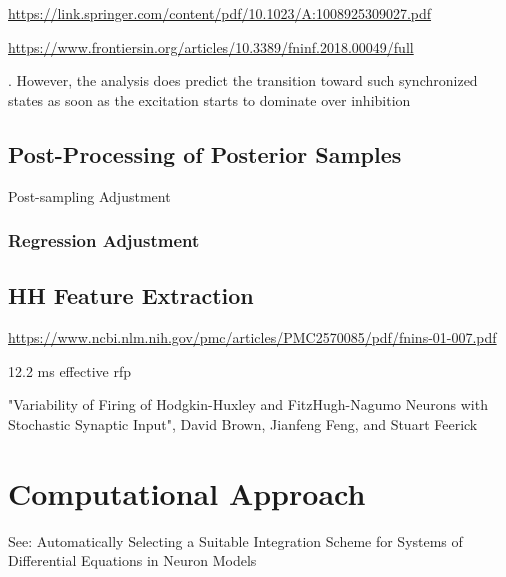 \url{https://link.springer.com/content/pdf/10.1023/A:1008925309027.pdf}

\url{https://www.frontiersin.org/articles/10.3389/fninf.2018.00049/full}

. However, the analysis does predict the transition
toward such synchronized states as soon as the excitation starts to dominate over inhibition

\section{Post-Processing of Posterior Samples}\label{sec:post_processing}

Post-sampling Adjustment



\subsection{Regression Adjustment}\label{sec:reg_adjust}

\section{HH Feature Extraction}\label{sec:hh_feature_extract}

\url{https://www.ncbi.nlm.nih.gov/pmc/articles/PMC2570085/pdf/fnins-01-007.pdf}



12.2 ms effective rfp

"Variability of Firing of Hodgkin-Huxley and FitzHugh-Nagumo Neurons with Stochastic Synaptic Input", David Brown, Jianfeng Feng, and Stuart Feerick 

\chapter{Computational Approach}\label{chap:computational}

See: Automatically Selecting a Suitable Integration Scheme for Systems of Differential Equations in Neuron Models


